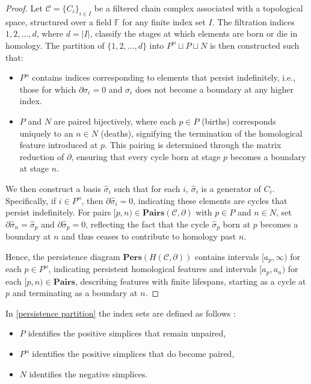 \begin{proof}
	Let $\mathcal{C}= \{C_{i}\}_{i \in I}$ be a filtered chain complex associated with
	a topological space, structured over a field $\mathbb{F}$ for any finite index
	set $I$. The filtration indices ${1, 2, \ldots, d}$, where $d = \vert I \vert$,
	classify the stages at which elements are born or die in homology. The
	partition of $\{1, 2, \ldots, d\}$ into $P^{\Join} \sqcup P \sqcup N$ is then
	constructed such that:
	\begin{itemize}
		\item $P^{\Join}$ contains indices corresponding to elements that persist indefinitely,
			i.e., those for which $\partial\sigma_{i} = 0$ and $\sigma_{i}$ does not
			become a boundary at any higher index.

		\item $P$ and $N$ are paired bijectively, where each $p \in P$ (births)
			corresponds uniquely to an $n \in N$ (deaths), signifying the termination of
			the homological feature introduced at $p$. This pairing is determined
			through the matrix reduction of $\partial$, ensuring that every cycle born
			at stage $p$ becomes a boundary at stage $n$.
	\end{itemize}

	We then construct a basis ${\hat{\sigma}_i}$ such that for each $i$, $\hat{\sigma}
	_{i}$ is a generator of $C_{i}$. Specifically, if $i \in P^{\Join}$, then
	$\partial\hat{\sigma}_{i} = 0$, indicating these elements are cycles that persist
	indefinitely. For pairs $[p, n) \in \textbf{Pairs}(\mathcal{C}, \partial)$
	with $p \in P$ and $n \in N$, set $\partial\hat{\sigma}_{n} = \hat{\sigma}_{p}$
	and $\partial\hat{\sigma}_{p} = 0$, reflecting the fact that the cycle
	$\hat{\sigma}_{p}$ born at $p$ becomes a boundary at $n$ and thus ceases to
	contribute to homology past $n$.

	Hence, the persistence diagram $\textbf{Pers}(H(\mathcal{C}, \partial))$ contains
	intervals $[a_{p}, \infty)$ for each $p \in P^{\Join}$, indicating persistent
	homological features and intervals $[a_{p}, a_{n})$ for each
	$[p, n) \in \textbf{Pairs}$, describing features with finite lifespans,
	starting as a cycle at $p$ and terminating as a boundary at $n$.
\end{proof}

In \ref{persistence partition} the index sets are defined as follows \cite[p.8]{de2011dualities}:
\begin{itemize}
	\item $P$ identifies the positive simplices that remain unpaired,

	\item $P^{\Join}$ identifies the positive simplices that do become paired,

	\item $N$ identifies the negative simplices.
\end{itemize}

